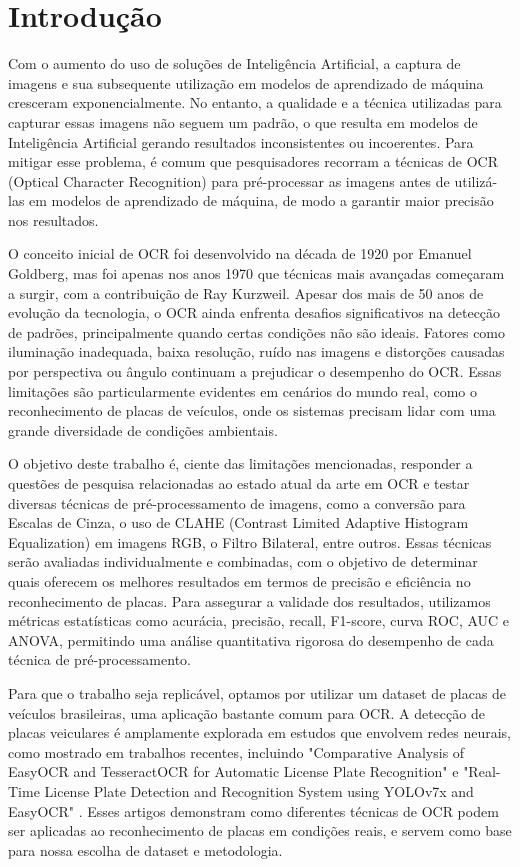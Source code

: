 \documentclass[conference]{IEEEtran}
\begin{document}
\section{Introdução}
Com o aumento do uso de soluções de Inteligência Artificial, a captura de imagens e sua subsequente utilização em modelos de aprendizado de máquina cresceram exponencialmente. No entanto, a qualidade e a técnica utilizadas para capturar essas imagens não seguem um padrão, o que resulta em modelos de Inteligência Artificial gerando resultados inconsistentes ou incoerentes. Para mitigar esse problema, é comum que pesquisadores recorram a técnicas de OCR (Optical Character Recognition) para pré-processar as imagens antes de utilizá-las em modelos de aprendizado de máquina, de modo a garantir maior precisão nos resultados.

O conceito inicial de OCR foi desenvolvido na década de 1920 por Emanuel Goldberg, mas foi apenas nos anos 1970 que técnicas mais avançadas começaram a surgir, com a contribuição de Ray Kurzweil. Apesar dos mais de 50 anos de evolução da tecnologia, o OCR ainda enfrenta desafios significativos na detecção de padrões, principalmente quando certas condições não são ideais. Fatores como iluminação inadequada, baixa resolução, ruído nas imagens e distorções causadas por perspectiva ou ângulo continuam a prejudicar o desempenho do OCR. Essas limitações são particularmente evidentes em cenários do mundo real, como o reconhecimento de placas de veículos, onde os sistemas precisam lidar com uma grande diversidade de condições ambientais.

O objetivo deste trabalho é, ciente das limitações mencionadas, responder a questões de pesquisa relacionadas ao estado atual da arte em OCR e testar diversas técnicas de pré-processamento de imagens, como a conversão para Escalas de Cinza, o uso de CLAHE (Contrast Limited Adaptive Histogram Equalization) em imagens RGB, o Filtro Bilateral, entre outros. Essas técnicas serão avaliadas individualmente e combinadas, com o objetivo de determinar quais oferecem os melhores resultados em termos de precisão e eficiência no reconhecimento de placas. Para assegurar a validade dos resultados, utilizamos métricas estatísticas como acurácia, precisão, recall, F1-score, curva ROC, AUC e ANOVA, permitindo uma análise quantitativa rigorosa do desempenho de cada técnica de pré-processamento.

Para que o trabalho seja replicável, optamos por utilizar um dataset de placas de veículos brasileiras, uma aplicação bastante comum para OCR. A detecção de placas veiculares é amplamente explorada em estudos que envolvem redes neurais, como mostrado em trabalhos recentes, incluindo "Comparative Analysis of EasyOCR and TesseractOCR for Automatic License Plate Recognition" \cite{b1} e "Real-Time License Plate Detection and Recognition System using YOLOv7x and EasyOCR" \cite{b2}. Esses artigos demonstram como diferentes técnicas de OCR podem ser aplicadas ao reconhecimento de placas em condições reais, e servem como base para nossa escolha de dataset e metodologia.
\end{document}
